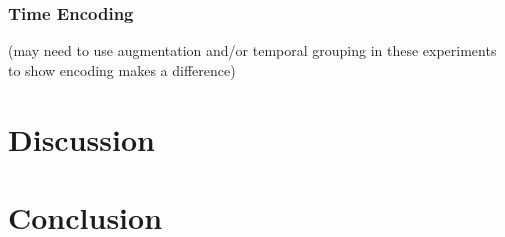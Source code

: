 \documentclass[runningheads]{llncs}
\begin{document}
\subsubsection{Time Encoding}

(may need to use augmentation and/or temporal grouping in these experiments to show encoding makes a difference)

\section{Discussion}

\section{Conclusion}

%
%
%


\end{document}
